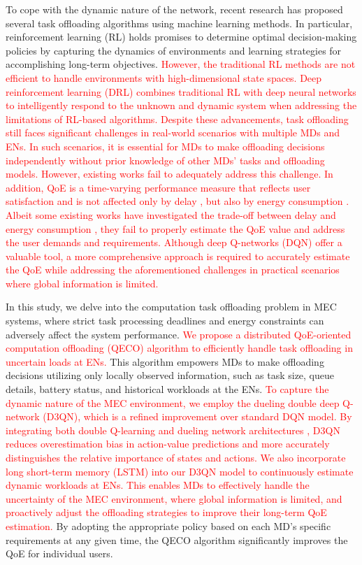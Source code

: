 \documentclass[10pt, journal,letterpaper]{IEEEtran}
\begin{document}
To cope with the dynamic nature of the network, recent research has proposed several task offloading algorithms using machine learning methods. In particular, reinforcement learning (RL) \cite{mnih2015human} holds promises to determine optimal decision-making policies by capturing the dynamics of environments and learning strategies for accomplishing long-term objectives. \textcolor{red}{However, the traditional RL methods are not efficient to  handle  environments with high-dimensional state  spaces. Deep reinforcement learning (DRL) combines  traditional RL  with  deep  neural  networks  to  intelligently respond to the unknown and dynamic system when addressing the limitations of RL-based algorithms. Despite these advancements, task offloading still faces significant challenges in real-world scenarios with multiple MDs and ENs. In such scenarios, it is essential for MDs to make offloading decisions independently  without prior knowledge of other MDs’ tasks and offloading models. However,  existing works fail to adequately address this challenge. In addition, QoE is a time-varying performance measure that reflects user satisfaction and is not affected only by delay \cite{guo2022energy}, but also by energy consumption \cite{tang2022uav}. Albeit some existing works have investigated the trade-off between delay and energy consumption \cite{li2022joint}, they fail to properly estimate the QoE value and address the user demands and requirements. Although deep Q-networks (DQN) offer a valuable tool, a more comprehensive approach is required to accurately estimate the QoE while addressing the aforementioned challenges in practical scenarios where global information is limited.}



    	
In this study, we delve into the computation task offloading problem in MEC systems, where strict task processing deadlines and energy constraints can adversely affect the system performance.   \textcolor{red}{We propose a distributed QoE-oriented computation offloading (QECO) algorithm to efficiently handle task offloading in uncertain loads at ENs.} This algorithm empowers MDs to make offloading decisions utilizing only locally observed information, such as task size, queue details, battery status, and historical workloads at the ENs. 
  \textcolor{red}{To capture the dynamic nature of the MEC environment, we employ the dueling double deep Q-network (D3QN), which is a refined improvement over standard DQN model. By integrating both double Q-learning \cite{van2016deep} and dueling network architectures \cite{wang2016dueling}, D3QN reduces overestimation bias in action-value predictions and more accurately distinguishes the relative importance of states and actions. We also incorporate long short-term memory (LSTM) \cite{hochreiter1997long} into our D3QN model to continuously estimate dynamic workloads at ENs. This enables MDs to effectively handle the uncertainty of the MEC environment, where global information is limited, and proactively adjust the offloading strategies to improve their long-term QoE estimation.} By adopting the appropriate policy based on each MD’s specific requirements at any given time, the QECO algorithm significantly improves the QoE for individual users. 
\end{document}
